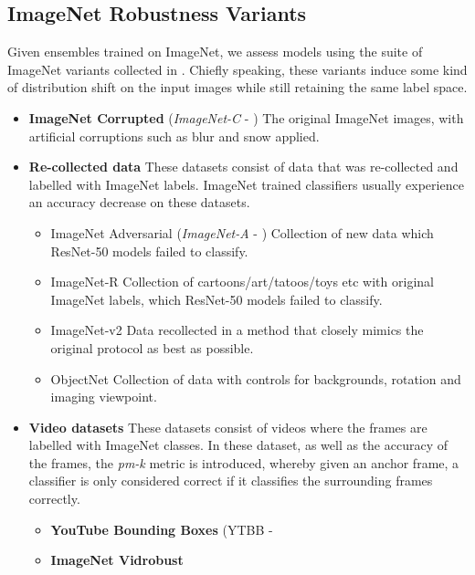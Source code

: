 \documentclass{article} \usepackage{iclr2021_conference,times}
\begin{document}
\subsection{ImageNet Robustness Variants}
\label{app:imagenet}
Given ensembles trained on ImageNet, we assess models using the suite of ImageNet variants collected in \citet{djolonga2020robustness}. Chiefly speaking, these variants induce some kind of distribution shift on the input images while still retaining the same label space.
\begin{itemize}
    \item \textbf{ImageNet Corrupted} (\textit{ImageNet-C} - \citep{imagenet_c})
    The original ImageNet images, with artificial corruptions such as blur and snow applied.
    \item \textbf{Re-collected data}
    These datasets consist of data that was re-collected and labelled with ImageNet labels. ImageNet trained classifiers usually experience an accuracy decrease on these datasets.
    \begin{itemize}
        \item ImageNet Adversarial (\textit{ImageNet-A} - \citep{imagenet_a})
        Collection of new data which ResNet-50 models failed to classify.
        \item ImageNet-R \citep{imagenet_r}
        Collection of cartoons/art/tatoos/toys etc with original ImageNet labels, which ResNet-50 models failed to classify.
        \item ImageNet-v2 \citep{imagenet_v2}
        Data recollected in a method that closely mimics the original protocol as best as possible.
        \item ObjectNet \citep{objectnet}
        Collection of data with controls for backgrounds, rotation and imaging viewpoint. 
    \end{itemize}
    \item \textbf{Video datasets}
    These datasets consist of videos where the frames are labelled with ImageNet classes. In these dataset, as well as the accuracy of the frames, the \textit{pm-k} metric is introduced, whereby given an anchor frame, a classifier is only considered correct if it classifies the surrounding  frames correctly.
    \begin{itemize}
        \item \textbf{YouTube Bounding Boxes} (YTBB - \citep{ytbb, shankar2019image}
        \item \textbf{ImageNet Vidrobust} \citep{deng2009imagenet, shankar2019image}
    \end{itemize}
\end{itemize} 
\end{document}
